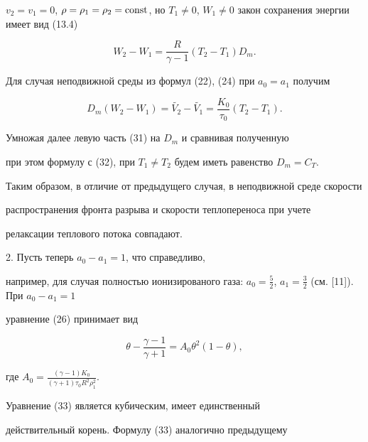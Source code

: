 $v _2 = v _1 = 0$, $ \rho =\rho _1 = \rho _2 = \const$, но $T_1


\neq 0$, $W_1 \neq 0$ закон сохранения энергии имеет вид (13.4)


\begin{equation}


W_2-W_1 = \frac {R}{\gamma - 1}(T_2 -T_1)D_m.


\end{equation}


Для случая неподвижной среды из формул (22), (24) при $a_0 =a_1$ получим


\begin{equation}


D_m (W_2 - W_1) = \widetilde{V_2} - \widetilde{V_1}


= \frac {K_0}{\tau _0} (T_2 -T_1).


\end{equation}


Умножая далее левую часть (31) на $D_m$ и сравнивая полученную


при этом формулу с (32), при $T_1 \neq T_2$ будем иметь равенство $D_m=C_T$.


Таким образом, в отличие от предыдущего случая, в неподвижной среде скорости


распространения фронта разрыва и скорости теплопереноса при учете 


релаксации теплового потока совпадают.


\medskip





2. Пусть теперь $a_0 - a_1 = 1$, что справедливо,


например, для случая полностью ионизированого газа: $a_0 = \frac


{5}{2}$, $a_1 = \frac {3}{2}$ (см. [11]). При $a_0 - a_1 = 1$


уравнение (26) принимает вид


\begin{equation}


\theta - \frac {\gamma -1}{\gamma +1} = A_0 \theta


^2 (1-\theta),


\end{equation}


где $A_0 = \frac {(\gamma - 1)K_0}{(\gamma +1) \tau _0R^2 \rho _1 ^2}$.


Уравнение (33) является кубическим, имеет единственный


действительный корень. Формулу (33) аналогично предыдущему


